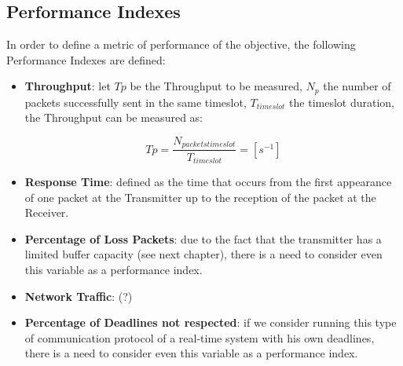 \subsection{Performance Indexes}
In order to define a metric of performance of the objective, the following Performance Indexes are defined:
\begin{itemize}
	\item \textbf{Throughput}: let $Tp$ be the Throughput to be measured, $N_{p}$ the number of packets successfully sent in the same timeslot, $T_{timeslot}$ the timeslot duration, the Throughput can be measured as:
	
	\begin{equation}
	Tp = \frac{N_{packets  timeslot}}{T_{timeslot}} = [s^{-1}]
	\end{equation}
	
	\item \textbf{Response Time}: defined as the time that occurs from the first appearance of one packet at the Transmitter up to the reception of the packet at the Receiver.
	
	\item \textbf{Percentage of Loss Packets}: due to the fact that the transmitter has a limited buffer capacity (see next chapter), there is a need to consider even this variable as a performance index.
	\item \textbf{Network Traffic}: (?)
	\item \textbf{Percentage of Deadlines not respected}: if we consider running this type of communication protocol of a real-time system with his own deadlines, there is a need to consider even this variable as a performance index.
\end{itemize}